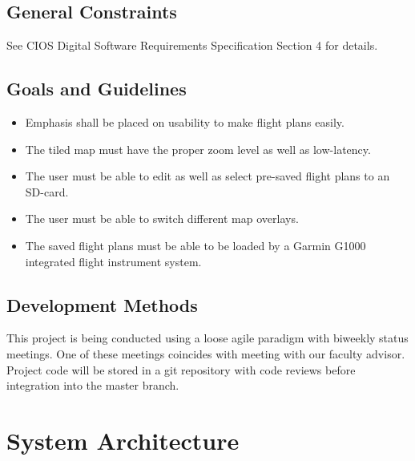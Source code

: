 \documentclass[12pt, letterpaper]{article}
\begin{document}
  \subsection{General Constraints}
    See CIOS Digital Software Requirements Specification Section 4 for details.
  \subsection{Goals and Guidelines}
    \begin{itemize}
      \setlength{\itemsep}{1pt}
      \setlength{\parskip}{0pt}
      \setlength{\parsep}{0pt}
      \item Emphasis shall be placed on usability to make flight plans easily.
      \item The tiled map must have the proper zoom level as well as low-latency.
      \item The user must be able to edit as well as select pre-saved flight plans to an SD-card.
      \item The user must be able to switch different map overlays.
      \item The saved flight plans must be able to be loaded by a Garmin G1000 integrated flight instrument system.
    \end{itemize}
  \subsection{Development Methods}
    This project is being conducted using a loose agile paradigm with biweekly status meetings.
    One of these meetings coincides with meeting with our faculty advisor.
    Project code will be stored in a git repository with code reviews before integration into the master branch.

\newpage
\section{System Architecture}
\end{document}
